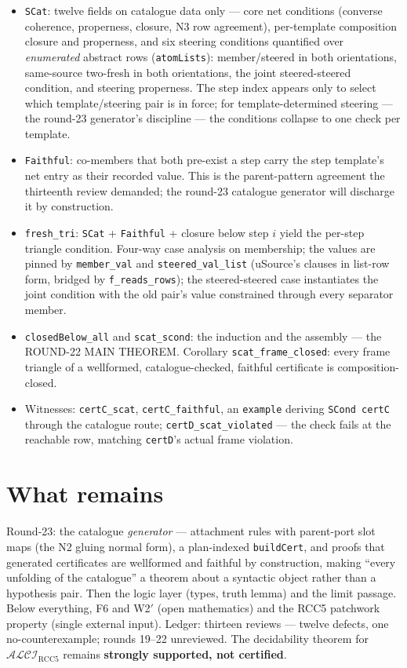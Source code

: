 \documentclass[11pt]{article}
\newcommand{\ALCIRCC}{\mathcal{ALCI}_{\mathrm{RCC5}}}
\newcommand{\code}[1]{\texttt{#1}}
\begin{document}
\begin{itemize}[leftmargin=2em]
\item \code{SCat}: twelve fields on catalogue data only --- core net
conditions (converse coherence, properness, closure, N3 row
agreement), per-template composition closure and properness, and six
steering conditions quantified over \emph{enumerated} abstract rows
(\code{atomLists}): member/steered in both orientations, same-source
two-fresh in both orientations, the joint steered-steered condition,
and steering properness.  The step index appears only to select which
template/steering pair is in force; for template-determined steering
--- the round-23 generator's discipline --- the conditions collapse
to one check per template.
\item \code{Faithful}: co-members that both pre-exist a step carry
the step template's net entry as their recorded value.  This is the
parent-pattern agreement the thirteenth review demanded; the round-23
catalogue generator will discharge it by construction.
\item \code{fresh\_tri}: \code{SCat} + \code{Faithful} + closure
below step $i$ yield the per-step triangle condition.  Four-way case
analysis on membership; the values are pinned by \code{member\_val}
and \code{steered\_val\_list} (uSource's clauses in list-row form,
bridged by \code{f\_reads\_rows}); the steered-steered case
instantiates the joint condition with the old pair's value
constrained through every separator member.
\item \code{closedBelow\_all} and \code{scat\_scond}: the induction
and the assembly --- the ROUND-22 MAIN THEOREM.  Corollary
\code{scat\_frame\_closed}: every frame triangle of a wellformed,
catalogue-checked, faithful certificate is composition-closed.
\item Witnesses: \code{certC\_scat}, \code{certC\_faithful}, an
\code{example} deriving \code{SCond certC} through the catalogue
route; \code{certD\_scat\_violated} --- the check fails at the
reachable row, matching \code{certD}'s actual frame violation.
\end{itemize}

\section{What remains}

Round-23: the catalogue \emph{generator} --- attachment rules with
parent-port slot maps (the N2 gluing normal form), a plan-indexed
\code{buildCert}, and proofs that generated certificates are
wellformed and faithful by construction, making ``every unfolding of
the catalogue'' a theorem about a syntactic object rather than a
hypothesis pair.  Then the logic layer (types, truth lemma) and the
limit passage.  Below everything, F6 and W2$'$ (open mathematics) and
the RCC5 patchwork property (single external input).  Ledger:
thirteen reviews --- twelve defects, one no-counterexample; rounds
19--22 unreviewed.  The decidability theorem for $\ALCIRCC$ remains
\textbf{strongly supported, not certified}.
\end{document}
